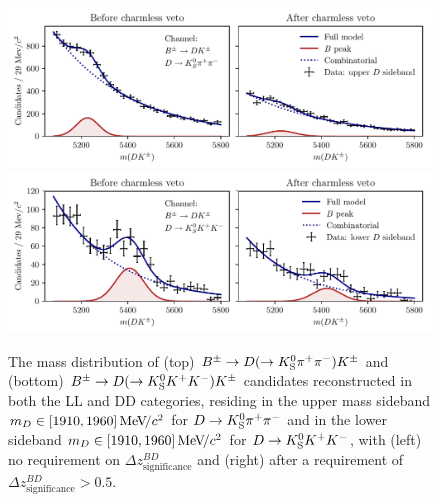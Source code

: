 \begin{figure}[tbp]
    \centering
    \includegraphics[width=0.95\columnwidth]{figures/analysis/background_checks/charmless_K_PiPi.pdf}
    \includegraphics[width=0.95\columnwidth]{figures/analysis/background_checks/charmless_K_KK.pdf}
    \caption{The \B mass distribution of (top) $\Bpm\to\D(\to\KS\pip\pim)\Kpm$ and (bottom) $\Bpm\to\D(\to\KS\Kp\Km)\Kpm$ candidates reconstructed in both the LL and DD categories, residing in the upper \D mass sideband $m_D\in [1910, 1960]\mevcc$ for $D\to\Ks\pip\pim$ and in the lower sideband $m_D\in [1910, 1960]\mevcc$ for $\D\to\KS\Kp\Km$, with (left) no requirement on $\Delta z^{BD}_{\text{significance}}$ and (right) after a requirement of $\Delta z^{BD}_{\text{significance}} > 0.5$. }
    \label{fig:charmless_Bmass_DK}
\end{figure}




